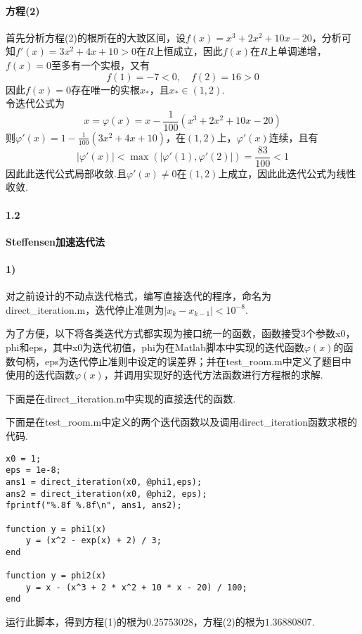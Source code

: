 \paragraph{方程(2)} 首先分析方程(2)的根所在的大致区间，设$f(x) = x^3 + 2x^2 + 10x - 20$，分析可知$f'(x) = 3x^2 + 4x + 10 > 0$在$R$上恒成立，因此$f(x)$在$R$上单调递增，$f(x) = 0$至多有一个实根，又有
\[f(1) = -7 < 0, \quad f(2) = 16 > 0\]
因此$f(x) = 0$存在唯一的实根$x_*$，且$x_* \in (1, 2)$.\\
令迭代公式为
\[x = \varphi(x) = x - \frac{1}{100} (x^3 + 2x^2 + 10x - 20)\]
则$\varphi'(x) = 1 - \frac{1}{100} (3x^2 + 4x + 10)$，在$(1, 2)$上，$\varphi'(x)$连续，且有
\[|\varphi'(x)| < \max (|\varphi'(1), \varphi'(2)|) = \frac{83}{100} < 1\]
因此此迭代公式局部收敛.且$\varphi'(x) \ne 0$在$(1, 2)$上成立，因此此迭代公式为线性收敛.

\paragraph{1.2} \textbf{Steffensen加速迭代法}
\paragraph{1)} 对之前设计的不动点迭代格式，编写直接迭代的程序，命名为direct\_iteration.m，迭代停止准则为$|x_{k} - x_{k - 1}| < 10^{-8}$.
\par 为了方便，以下将各类迭代方式都实现为接口统一的函数，函数接受3个参数x0，phi和eps，其中x0为迭代初值，phi为在Matlab脚本中实现的迭代函数$\varphi(x)$的函数句柄，eps为迭代停止准则中设定的误差界；并在test\_room.m中定义了题目中使用的迭代函数$\varphi(x)$，并调用实现好的迭代方法函数进行方程根的求解.
\par 下面是在direct\_iteration.m中实现的直接迭代的函数.

\par 下面是在test\_room.m中定义的两个迭代函数以及调用direct\_iteration函数求根的代码.
\begin{lstlisting}
x0 = 1;
eps = 1e-8;
ans1 = direct_iteration(x0, @phi1,eps);
ans2 = direct_iteration(x0, @phi2, eps);
fprintf("%.8f %.8f\n", ans1, ans2);

function y = phi1(x)
    y = (x^2 - exp(x) + 2) / 3;
end

function y = phi2(x)
    y = x - (x^3 + 2 * x^2 + 10 * x - 20) / 100;
end
\end{lstlisting}
\par 运行此脚本，得到方程(1)的根为$0.25753028$，方程(2)的根为$1.36880807$.

